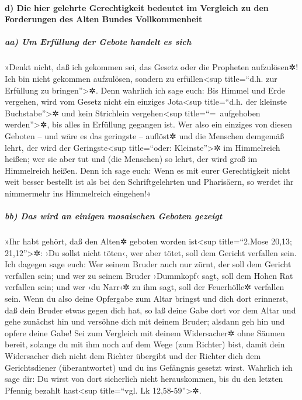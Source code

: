 \hypertarget{d-die-hier-gelehrte-gerechtigkeit-bedeutet-im-vergleich-zu-den-forderungen-des-alten-bundes-vollkommenheit}{%
\paragraph{d) Die hier gelehrte Gerechtigkeit bedeutet im Vergleich zu
den Forderungen des Alten Bundes
Vollkommenheit}\label{d-die-hier-gelehrte-gerechtigkeit-bedeutet-im-vergleich-zu-den-forderungen-des-alten-bundes-vollkommenheit}}

\hypertarget{aa-um-erfuxfcllung-der-gebote-handelt-es-sich}{%
\subparagraph{aa) Um Erfüllung der Gebote handelt es
sich}\label{aa-um-erfuxfcllung-der-gebote-handelt-es-sich}}

 »Denkt nicht, daß ich gekommen sei, das Gesetz oder die
Propheten aufzulösen✲! Ich bin nicht gekommen aufzulösen, sondern zu
erfüllen\textless sup title=``d.h. zur Erfüllung zu
bringen''\textgreater✲.  Denn wahrlich ich sage euch: Bis
Himmel und Erde vergehen, wird vom Gesetz nicht ein einziges
Jota\textless sup title=``d.h. der kleinste Buchstabe''\textgreater✲ und
kein Strichlein vergehen\textless sup title=``=~aufgehoben
werden''\textgreater✲, bis alles in Erfüllung gegangen ist.
 Wer also ein einziges von diesen Geboten -- und wäre es
das geringste -- auflöst✲ und die Menschen demgemäß lehrt, der wird der
Geringste\textless sup title=``oder: Kleinste''\textgreater✲ im
Himmelreich heißen; wer sie aber tut und (die Menschen) so lehrt, der
wird groß im Himmelreich heißen.  Denn ich sage euch:
Wenn es mit eurer Gerechtigkeit nicht weit besser bestellt ist als bei
den Schriftgelehrten und Pharisäern, so werdet ihr nimmermehr ins
Himmelreich eingehen!«

\hypertarget{bb-das-wird-an-einigen-mosaischen-geboten-gezeigt}{%
\subparagraph{bb) Das wird an einigen mosaischen Geboten
gezeigt}\label{bb-das-wird-an-einigen-mosaischen-geboten-gezeigt}}

 »Ihr habt gehört, daß den Alten✲ geboten worden
ist\textless sup title=``2.Mose 20,13; 21,12''\textgreater✲: ›Du sollst
nicht töten‹, wer aber tötet, soll dem Gericht verfallen sein.
 Ich dagegen sage euch: Wer seinem Bruder auch nur zürnt,
der soll dem Gericht verfallen sein; und wer zu seinem Bruder ›Dummkopf‹
sagt, soll dem Hohen Rat verfallen sein; und wer ›du Narr‹✲ zu ihm sagt,
soll der Feuerhölle✲ verfallen sein.  Wenn du also deine
Opfergabe zum Altar bringst und dich dort erinnerst, daß dein Bruder
etwas gegen dich hat,  so laß deine Gabe dort vor dem
Altar und gehe zunächst hin und versöhne dich mit deinem Bruder; alsdann
geh hin und opfere deine Gabe!  Sei zum Vergleich mit
deinem Widersacher✲ ohne Säumen bereit, solange du mit ihm noch auf dem
Wege (zum Richter) bist, damit dein Widersacher dich nicht dem Richter
übergibt und der Richter dich dem Gerichtsdiener (überantwortet) und du
ins Gefängnis gesetzt wirst.  Wahrlich ich sage dir: Du
wirst von dort sicherlich nicht herauskommen, bis du den letzten Pfennig
bezahlt hast\textless sup title=``vgl. Lk 12,58-59''\textgreater✲.

